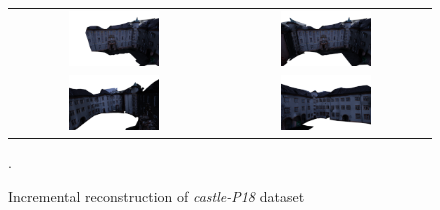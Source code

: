 \begin{figure}[t]
\centering
\begin{tabular}{cc}
\includegraphics[width=0.45\textwidth]{./img/ch-incr-dens/castle01}&
\includegraphics[width=0.45\textwidth]{./img/ch-incr-dens/castle02}\\
\includegraphics[width=0.45\textwidth]{./img/ch-incr-dens/castle03}&
\includegraphics[width=0.45\textwidth]{./img/ch-incr-dens/castle04}
\end{tabular}
\caption{Incremental reconstruction of \emph{castle-P18} dataset}.
\label{fig:castle}
\end{figure}

